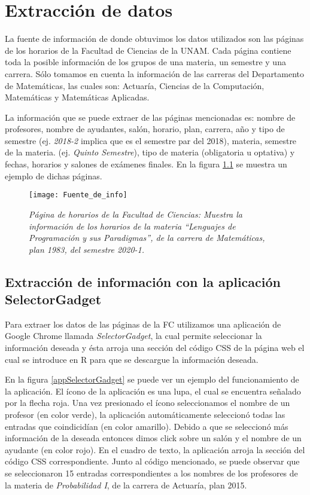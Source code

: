 \chapter{Extracción de datos}

La fuente de información de donde obtuvimos los datos utilizados son las páginas de los horarios de la Facultad de Ciencias de la UNAM. Cada página contiene toda la posible información de los grupos de una materia, un semestre y una carrera. Sólo tomamos en cuenta la información de las carreras del Departamento de Matemáticas, las cuales son: Actuaría, Ciencias de la Computación, Matemáticas y Matemáticas Aplicadas.

La información que se puede extraer de las páginas mencionadas es: nombre de profesores, nombre de ayudantes, salón, horario, plan, carrera, año y tipo de semestre (ej. \textit{2018-2} implica que es el semestre par del 2018), materia, semestre de la materia. (ej. \textit{Quinto Semestre}), tipo de materia (obligatoria u optativa) y fechas, horarios y salones de exámenes finales. En la figura \ref{pagFC} se muestra un ejemplo de dichas páginas.

\begin{figure}[H]
\centering
\texttt{[image: Fuente\_de\_info]} %
\caption[\textit{Página de horarios de la Facultad de Ciencias}]{\textit{Página de horarios de la Facultad de Ciencias: Muestra la información de los horarios de la materia ``Lenguajes de Programación y sus Paradigmas'', de la carrera de Matemáticas, plan 1983, del semestre 2020-1.}}\label{pagFC}
\end{figure}

\section{Extracción de información con la aplicación SelectorGadget}

Para extraer los datos de las páginas de la FC utilizamos una aplicación de Google Chrome llamada \textit{SelectorGadget}, la cual permite seleccionar la información deseada y ésta arroja una sección del código CSS de la página web el cual se introduce en R para que se descargue la información deseada.

En la figura \ref{appSelectorGadget} se puede ver un ejemplo del funcionamiento de la aplicación. El ícono de la aplicación es una lupa, el cual se encuentra señalado por la flecha roja. Una vez presionado el ícono seleccionamos el nombre de un profesor (en color verde), la aplicación automáticamente seleccionó todas las entradas que coindicidían (en color amarillo). Debido a que se seleccionó más información de la deseada entonces dimos click sobre un salón y el nombre de un ayudante (en color rojo). En el cuadro de texto, la aplicación arroja la sección del código CSS correspondiente. Junto al código mencionado, se puede observar que se seleccionaron 15 entradas correspondientes a los nombres de los profesores de la materia de \textit{Probabilidad I}, de la carrera de Actuaría, plan 2015.

